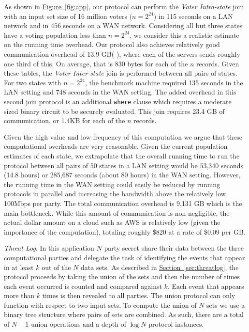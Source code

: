 \documentclass[11pt,letterpaper]{article}
\newcommand{\namedref}[2]{\hyperref[#2]{#1~\ref*{#2}}}
\newcommand{\sectionref}[1]{\namedref{Section}{#1}}
\newcommand{\figureref}[1]{\namedref{Figure}{#1}}
\renewcommand{\paragraph}[1]{\vspace{0.1cm}\noindent\emph{#1}.} %
\providecommand{\DIFdeltex}[1]{{\protect\color{red}\sout{#1}}}                      %
\providecommand{\DIFdelbegin}{} %
\providecommand{\DIFdelend}{} %
\providecommand{\DIFdel}[1]{\texorpdfstring{\DIFdeltex{#1}}{}} %
\begin{document}
As shown in \figureref{fig:app}, our  protocol can perform the \emph{Voter Intra-state} join with an input set size of 16 million voters ($n=2^{24}$) in 115 seconds on a LAN network and in 456 seconds on a WAN network. Considering all but three states have a voting population less than $n=2^{24}$, we consider this a realistic estimate on the running time overhead. Our protocol also achieves relatively good communication overhead of 13.9 GB\DIFdelbegin \DIFdel{(}%
\DIFdel{)}\DIFdelend , where each of the servers sends roughly one third of this. On average, that is 830 bytes for each of the $n$ records. Given these tables, the \emph{Voter Inter-state} join is performed between all pairs of states. For two states with $n=2^{24}$, the benchmark machine required 135 seconds in the LAN setting and 748 seconds in the WAN setting. The added overhead in this second join protocol is an additional \texttt{where} clause which requires a moderate sized binary circuit to be securely evaluated. This join requires 23.4 GB of communication, or 1.4KB for each of the $n$ records.

Given the high value and low frequency of this computation we argue that these computational overheads are very reasonable. Given the current population estimates of each state, we extrapolate that the overall running time to run the protocol between all pairs of 50 states in a LAN setting would be 53,340 seconds (14.8 hours) or  285,687 seconds (about 80 hours) in the WAN setting. However, the running time in the WAN setting could easily be reduced by running protocols in parallel and increasing the bandwidth above the relatively low 100Mbps per party. The total communication overhead is 9,131 GB which is the main bottleneck.  While this amount of communication is non-negligible, the actual dollar amount on a cloud such as AWS\cite{aws} is relatively low (given the importance of the computation), totaling roughly \$820 at a rate of \$0.09 per GB\cite{aws_pricing}. 


\paragraph{Threat Log} In this application $N$ party secret share their data between the three computational parties and delegate the task of identifying the events that appear in at least $k$ out of the $N$ data sets. As described in \sectionref{sec:threatlog}, the protocol proceeds by taking the union of the sets and then the number of times each event occurred is counted and compared against $k$. Each event that appears more than $k$ times is then revealed to all parties. The union protocol can only function with respect to two input sets. To compute the union of $N$ sets we use a binary tree structure where pairs of sets are combined. As such, there are a total of $N-1$ union operations and a depth of $\log N$ protocol instances.
\end{document}
